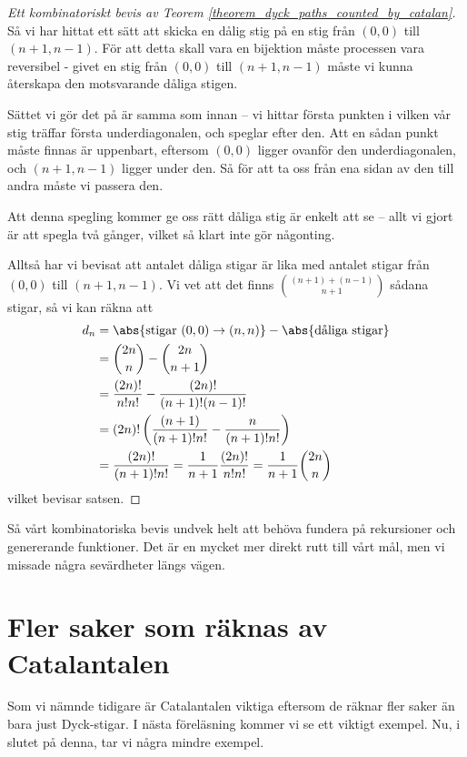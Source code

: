\documentclass[nobib]{tufte-handout}
\begin{document}
\begin{proof}[Ett kombinatoriskt bevis av Teorem \ref{theorem_dyck_paths_counted_by_catalan}]
    Så vi har hittat ett sätt att skicka en dålig stig på en stig från $(0,0)$ till $(n+1,n-1)$. För att detta skall vara en bijektion måste processen vara reversibel - givet en stig från $(0,0)$ till $(n+1,n-1)$ måste vi kunna återskapa den motsvarande dåliga stigen.

    Sättet vi gör det på är samma som innan -- vi hittar första punkten i vilken vår stig träffar första underdiagonalen, och speglar efter den. Att en sådan punkt måste finnas är uppenbart, eftersom $(0,0)$ ligger ovanför den underdiagonalen, och $(n+1,n-1)$ ligger under den. Så för att ta oss från ena sidan av den till andra måste vi passera den.

    Att denna spegling kommer ge oss rätt dåliga stig är enkelt att se -- allt vi gjort är att spegla två gånger, vilket så klart inte gör någonting.

    Alltså har vi bevisat att antalet dåliga stigar är lika med antalet stigar från $(0,0)$ till $(n+1,n-1)$. Vi vet att det finns $\binom{(n + 1) + (n - 1)}{n+1}$ sådana stigar, så vi kan räkna att
    \begin{align*}
        d_n &= \abs{\text{stigar }(0,0)\to(n,n)} - \abs{\text{dåliga stigar}}\\
        &= \binom{2n}{n} - \binom{2n}{n+1}\\
        &= \frac{(2n)!}{n!n!} - \frac{(2n)!}{(n+1)!(n-1)!}\\
        &= (2n)!\left(\frac{(n+1)}{(n+1)!n!} - \frac{n}{(n+1)!n!}\right)\\
        &= \frac{(2n)!}{(n+1)!n!} = \frac{1}{n+1}\frac{(2n)!}{n!n!} = \frac{1}{n+1}\binom{2n}{n}
    \end{align*}
    vilket bevisar satsen.
\end{proof}

Så vårt kombinatoriska bevis undvek helt att behöva fundera på rekursioner och genererande funktioner. Det är en mycket mer direkt rutt till vårt mål, men vi missade några sevärdheter längs vägen.

\section{Fler saker som räknas av Catalantalen}

Som vi nämnde tidigare är Catalantalen viktiga eftersom de räknar fler saker än bara just Dyck-stigar. I nästa föreläsning kommer vi se ett viktigt exempel. Nu, i slutet på denna, tar vi några mindre exempel.
\end{document}
